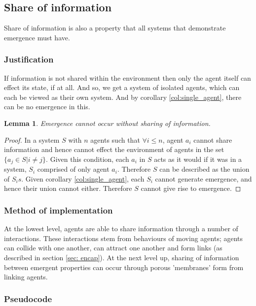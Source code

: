 \documentclass{article}
\newtheorem{lemma}[theorem]{Lemma}
\begin{document}
  \subsection{Share of information}
  
    Share of information is also a property that all systems that demonstrate emergence must have. 

    \subsubsection{Justification}
      
    If information is not shared within the environment then only the agent itself can effect its state, if at all. And so, we get a system of isolated agents, which can each be viewed as their own system. And by corollary \ref{col:single_agent}, there can be no emergence in this.

      \begin{lemma}
        Emergence cannot occur without sharing of information.
      \end{lemma}
      \begin{proof}

        In a system $S$ with $n$ agents such that $\forall i \leq n$, agent $a_i$ cannot share information and hence cannot effect the environment of agents in the set $\{ a_j \in S | i \not = j \}$. Given this condition, each $a_i$ in $S$ acts as it would if it was in a system, $S_i$ comprised of only agent $a_i$. Therefore $S$ can be described as the union of $S_i s$. Given corollary \ref{col:single_agent}, each $S_i$ cannot generate emergence, and hence their union cannot either. Therefore $S$ cannot give rise to emergence. 

      \end{proof}

    \subsubsection{Method of implementation}

      At the lowest level, agents are able to share information through a number of interactions. These interactions stem from behaviours of moving agents; agents can collide with one another, can attract one another and form links (as described in section \ref{sec: encap}). At the next level up, sharing of information between emergent properties can occur through porous 'membranes' form from linking agents.

    \subsubsection{Pseudocode}
      
\end{document}
